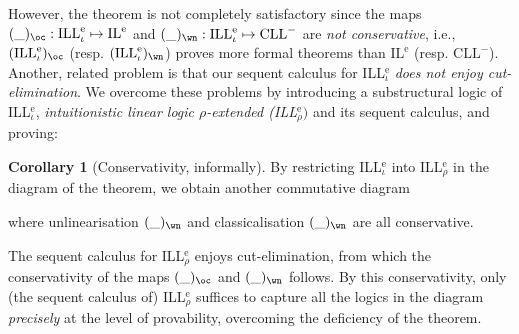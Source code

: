 \documentclass[a4paper]{article}
\theoremstyle{definition}
\theoremstyle{theorem}
\newtheorem*{corollary*}{Corollary}
\theoremstyle{remark}
\begin{document}
However, the theorem is not completely satisfactory since the maps $(\_)_\oc : \text{ILL}^{\text{e}}_\iota \mapsto \text{IL}^{\text{e}}$ and $(\_)_\wn : \text{ILL}^{\text{e}}_\iota \mapsto \text{CLL}^-$ are \emph{not conservative}, i.e., $(\text{ILL}^{\text{e}}_\iota)_\oc$ (resp. $(\text{ILL}^{\text{e}}_\iota)_\wn$) proves more formal theorems than $\text{IL}^{\text{e}}$ (resp. $\text{CLL}^-$).
Another, related problem is that our sequent calculus for ILL$^{\text{e}}_\iota$ \emph{does not enjoy cut-elimination}. %
We overcome these problems by introducing a substructural logic of ILL$^{\text{e}}_\iota$, \emph{intuitionistic linear logic $\rho$-extended (ILL$^{\text{e}}_\rho)$} and its sequent calculus, and proving:
\begin{corollary*}[Conservativity, informally]
By restricting ILL$^{\text{e}}_\iota$ into ILL$^{\text{e}}_\rho$ in the diagram of the theorem, we obtain another commutative diagram
\begin{mathpar}
\end{mathpar}
where unlinearisation $(\_)_\wn$ and classicalisation $(\_)_\wn$ are all conservative.
\end{corollary*}

The sequent calculus for ILL$^{\text{e}}_\rho$ enjoys cut-elimination, from which the conservativity of the maps $(\_)_\oc$ and $(\_)_\wn$ follows.
By this conservativity, only (the sequent calculus of) ILL$^{\text{e}}_\rho$ suffices to capture all the logics in the diagram \emph{precisely} at the level of provability, overcoming the deficiency of the theorem.
\end{document}
